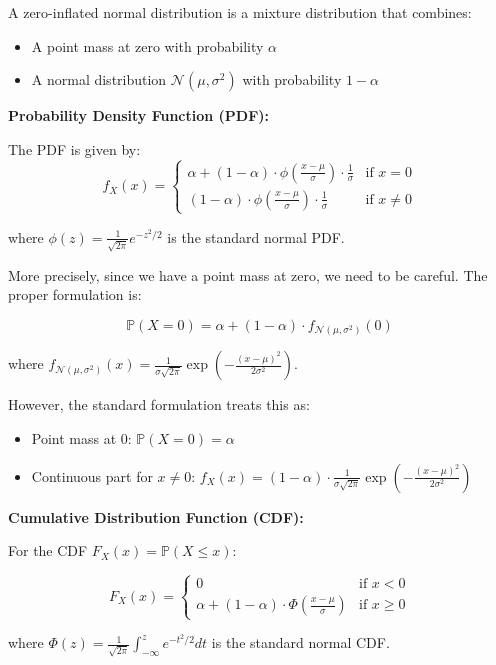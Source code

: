 \documentclass[12pt]{article}
\begin{document}
\begin{solution}
A zero-inflated normal distribution is a mixture distribution that combines:
\begin{itemize}
    \item A point mass at zero with probability \(\alpha\)
    \item A normal distribution \(\mathcal{N}(\mu, \sigma^2)\) with probability \(1-\alpha\)
\end{itemize}

\textbf{Probability Density Function (PDF):}

The PDF is given by:
\[
f_X(x) = \begin{cases}
\alpha + (1-\alpha) \cdot \phi\left(\frac{x-\mu}{\sigma}\right) \cdot \frac{1}{\sigma} & \text{if } x = 0 \\
(1-\alpha) \cdot \phi\left(\frac{x-\mu}{\sigma}\right) \cdot \frac{1}{\sigma} & \text{if } x \neq 0
\end{cases}
\]

where \(\phi(z) = \frac{1}{\sqrt{2\pi}}e^{-z^2/2}\) is the standard normal PDF.

More precisely, since we have a point mass at zero, we need to be careful. The proper formulation is:

\[
\mathbb{P}(X = 0) = \alpha + (1-\alpha) \cdot f_{\mathcal{N}(\mu, \sigma^2)}(0)
\]

where \(f_{\mathcal{N}(\mu, \sigma^2)}(x) = \frac{1}{\sigma\sqrt{2\pi}} \exp\left(-\frac{(x-\mu)^2}{2\sigma^2}\right)\).

However, the standard formulation treats this as:
\begin{itemize}
    \item Point mass at 0: \(\mathbb{P}(X = 0) = \alpha\)
    \item Continuous part for \(x \neq 0\): \(f_X(x) = (1-\alpha) \cdot \frac{1}{\sigma\sqrt{2\pi}} \exp\left(-\frac{(x-\mu)^2}{2\sigma^2}\right)\)
\end{itemize}

\textbf{Cumulative Distribution Function (CDF):}

For the CDF \(F_X(x) = \mathbb{P}(X \leq x)\):

\[
F_X(x) = \begin{cases}
0 & \text{if } x < 0 \\
\alpha + (1-\alpha) \cdot \Phi\left(\frac{x-\mu}{\sigma}\right) & \text{if } x \geq 0
\end{cases}
\]

where \(\Phi(z) = \frac{1}{\sqrt{2\pi}} \int_{-\infty}^{z} e^{-t^2/2} dt\) is the standard normal CDF.
\end{solution}
\end{document}
